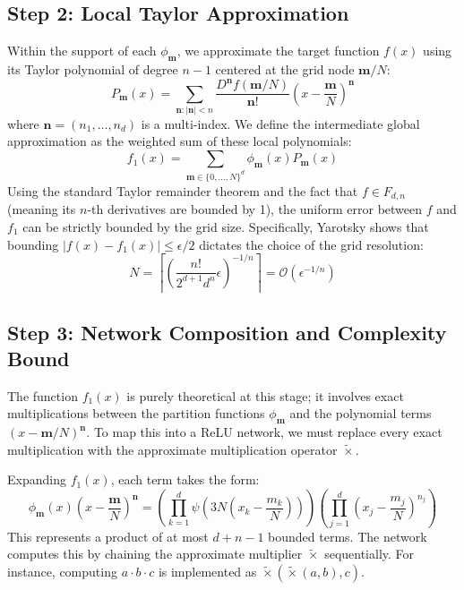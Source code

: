 \documentclass[12pt]{article}
\begin{document}
\subsection{Step 2: Local Taylor Approximation}
Within the support of each $\phi_{\mathbf{m}}$, we approximate the target function $f(x)$ using its Taylor polynomial of degree $n-1$ centered at the grid node $\mathbf{m}/N$:
\begin{equation}
P_{\mathbf{m}}(x) = \sum_{\mathbf{n}: |\mathbf{n}| < n} \frac{D^{\mathbf{n}}f(\mathbf{m}/N)}{\mathbf{n}!} \left(x - \frac{\mathbf{m}}{N}\right)^{\mathbf{n}}
\end{equation}
where $\mathbf{n} = (n_1, \dots, n_d)$ is a multi-index. We define the intermediate global approximation as the weighted sum of these local polynomials:
\begin{equation}
f_1(x) = \sum_{\mathbf{m} \in \{0, \dots, N\}^d} \phi_{\mathbf{m}}(x) P_{\mathbf{m}}(x)
\end{equation}
Using the standard Taylor remainder theorem and the fact that $f \in F_{d,n}$ (meaning its $n$-th derivatives are bounded by 1), the uniform error between $f$ and $f_1$ can be strictly bounded by the grid size. Specifically, Yarotsky shows that bounding $|f(x) - f_1(x)| \le \epsilon/2$ dictates the choice of the grid resolution:
\begin{equation}
N = \left\lceil \left( \frac{n!}{2^{d+1} d^n} \epsilon \right)^{-1/n} \right\rceil = \mathcal{O}(\epsilon^{-1/n})
\end{equation}

\subsection{Step 3: Network Composition and Complexity Bound}
The function $f_1(x)$ is purely theoretical at this stage; it involves exact multiplications between the partition functions $\phi_{\mathbf{m}}$ and the polynomial terms $(x - \mathbf{m}/N)^{\mathbf{n}}$. To map this into a ReLU network, we must replace every exact multiplication with the approximate multiplication operator $\tilde{\times}$.

Expanding $f_1(x)$, each term takes the form:
\begin{equation}
\phi_{\mathbf{m}}(x) \left(x - \frac{\mathbf{m}}{N}\right)^{\mathbf{n}} = \left( \prod_{k=1}^d \psi\left(3N\left(x_k - \frac{m_k}{N}\right)\right) \right) \left( \prod_{j=1}^d \left(x_j - \frac{m_j}{N}\right)^{n_j} \right)
\end{equation}
This represents a product of at most $d + n - 1$ bounded terms. The network computes this by chaining the approximate multiplier $\tilde{\times}$ sequentially. For instance, computing $a \cdot b \cdot c$ is implemented as $\tilde{\times}(\tilde{\times}(a, b), c)$. 
\end{document}

